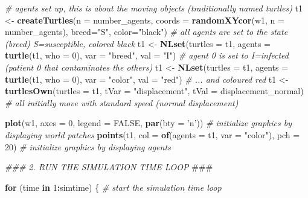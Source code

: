 \documentclass[
]{article}
\newenvironment{Shaded}{\begin{snugshade}}{\end{snugshade}}
\newcommand{\AlertTok}[1]{\textcolor[rgb]{0.94,0.16,0.16}{#1}}
\newcommand{\CommentTok}[1]{\textcolor[rgb]{0.56,0.35,0.01}{\textit{#1}}}
\newcommand{\ControlFlowTok}[1]{\textcolor[rgb]{0.13,0.29,0.53}{\textbf{#1}}}
\newcommand{\DataTypeTok}[1]{\textcolor[rgb]{0.13,0.29,0.53}{#1}}
\newcommand{\DecValTok}[1]{\textcolor[rgb]{0.00,0.00,0.81}{#1}}
\newcommand{\KeywordTok}[1]{\textcolor[rgb]{0.13,0.29,0.53}{\textbf{#1}}}
\newcommand{\NormalTok}[1]{#1}
\newcommand{\OperatorTok}[1]{\textcolor[rgb]{0.81,0.36,0.00}{\textbf{#1}}}
\newcommand{\OtherTok}[1]{\textcolor[rgb]{0.56,0.35,0.01}{#1}}
\newcommand{\StringTok}[1]{\textcolor[rgb]{0.31,0.60,0.02}{#1}}
\begin{document}
\begin{Shaded}
\begin{Highlighting}[]
    \CommentTok{# agents set up, this is about the moving objects (traditionally named turtles)}
\NormalTok{    t1 <-}\StringTok{ }\KeywordTok{createTurtles}\NormalTok{(}\DataTypeTok{n =}\NormalTok{ number_agents, }\DataTypeTok{coords =} \KeywordTok{randomXYcor}\NormalTok{(w1, }\DataTypeTok{n =}\NormalTok{ number_agents), }\DataTypeTok{breed=}\StringTok{"S"}\NormalTok{, }\DataTypeTok{color=}\StringTok{"black"}\NormalTok{) }\CommentTok{# all agents are set to the state (breed) S=susceptible, colored black}
\NormalTok{    t1 <-}\StringTok{ }\KeywordTok{NLset}\NormalTok{(}\DataTypeTok{turtles =}\NormalTok{ t1, }\DataTypeTok{agents =} \KeywordTok{turtle}\NormalTok{(t1, }\DataTypeTok{who =} \DecValTok{0}\NormalTok{), }\DataTypeTok{var =} \StringTok{"breed"}\NormalTok{, }\DataTypeTok{val =} \StringTok{"I"}\NormalTok{) }\CommentTok{# agent 0 is set to I=infected (patient 0 that contaminates the others) }
\NormalTok{    t1 <-}\StringTok{ }\KeywordTok{NLset}\NormalTok{(}\DataTypeTok{turtles =}\NormalTok{ t1, }\DataTypeTok{agents =} \KeywordTok{turtle}\NormalTok{(t1, }\DataTypeTok{who =} \DecValTok{0}\NormalTok{), }\DataTypeTok{var =} \StringTok{"color"}\NormalTok{, }\DataTypeTok{val =} \StringTok{"red"}\NormalTok{) }\CommentTok{# ... and coloured red }
\NormalTok{    t1 <-}\StringTok{ }\KeywordTok{turtlesOwn}\NormalTok{(}\DataTypeTok{turtles =}\NormalTok{ t1, }\DataTypeTok{tVar =} \StringTok{"displacement"}\NormalTok{, }\DataTypeTok{tVal =}\NormalTok{ displacement_normal) }\CommentTok{# all initially move with standard speed (normal displacement)}
    
    \KeywordTok{plot}\NormalTok{(w1, }\DataTypeTok{axes =} \DecValTok{0}\NormalTok{, }\DataTypeTok{legend =} \OtherTok{FALSE}\NormalTok{, }\KeywordTok{par}\NormalTok{(}\DataTypeTok{bty =} \StringTok{'n'}\NormalTok{)) }\CommentTok{# initialize graphics by displaying world patches}
    \KeywordTok{points}\NormalTok{(t1, }\DataTypeTok{col =} \KeywordTok{of}\NormalTok{(}\DataTypeTok{agents =}\NormalTok{ t1, }\DataTypeTok{var =} \StringTok{"color"}\NormalTok{), }\DataTypeTok{pch =} \DecValTok{20}\NormalTok{) }\CommentTok{# initialize graphics by displaying agents}
    
    
    
    
    
    \CommentTok{### 2. RUN THE SIMULATION TIME LOOP }\AlertTok{###}
    
    \ControlFlowTok{for}\NormalTok{ (time }\ControlFlowTok{in} \DecValTok{1}\OperatorTok{:}\NormalTok{simtime) \{ }\CommentTok{# start the simulation time loop}
      

\end{Highlighting}
\end{Shaded}
\end{document}
